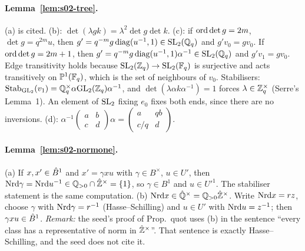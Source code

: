 \paragraph{Lemma~\ref{lem:s02-tree}.} (a) is cited. (b): $\det(\lambda g k)=\lambda^2\det g\det k$. (c): if
$\mathrm{ord}\det g=2m$, $\det g=q^{2m}u$, then $g'=q^{-m}g\,\mathrm{diag}(u^{-1},1)\in\mathrm{SL}_2(\mathbb{Q}_q)$ and $g'v_0=gv_0$. If
$\mathrm{ord}\det g=2m+1$, then $g'=q^{-m}g\,\mathrm{diag}(u^{-1},1)\alpha^{-1}\in\mathrm{SL}_2(\mathbb{Q}_q)$ and $g'v_1=gv_0$. Edge
transitivity holds because $\mathrm{SL}_2(\mathbb{Z}_q)\to\mathrm{SL}_2(\mathbb{F}_q)$ is surjective and acts transitively on
$\mathbb P^1(\mathbb{F}_q)$, which is the set of neighbours of $v_0$. Stabilisers: $\operatorname{Stab}_{\mathrm{GL}_2}(v_1)=\mathbb{Q}_q^\times\alpha\mathrm{GL}_2(\mathbb{Z}_q)\alpha^{-1}$,
and $\det(\lambda\alpha k\alpha^{-1})=1$ forces $\lambda\in\mathbb{Z}_q^\times$ (Serre's Lemma~1). An element of
$\mathrm{SL}_2$ fixing $e_0$ fixes both ends, since there are no inversions. (d):
$\alpha^{-1}\left(\begin{smallmatrix}a&b\\c&d\end{smallmatrix}\right)\alpha=\left(\begin{smallmatrix}a&qb\\c/q&d\end{smallmatrix}\right)$.

\paragraph{Lemma~\ref{lem:s02-normone}.} (a) If $x,x'\in\hat{B}^1$ and $x'=\gamma xu$ with $\gamma\in B^\times$,
$u\in U'$, then $\mathrm{Nrd}\gamma=\mathrm{Nrd} u^{-1}\in\mathbb{Q}_{>0}\cap\hat{\mathbb{Z}}^\times=\{1\}$, so $\gamma\in B^1$ and $u\in U'^1$. The
stabiliser statement is the same computation. (b) $\mathrm{Nrd} x\in\hat{\mathbb{Q}}^\times=\mathbb{Q}_{>0}\hat{\mathbb{Z}}^\times$. Write
$\mathrm{Nrd} x=rz$, choose $\gamma$ with $\mathrm{Nrd}\gamma=r^{-1}$ (Hasse--Schilling) and $u\in U'$ with $\mathrm{Nrd} u=z^{-1}$;
then $\gamma xu\in\hat{B}^1$. \emph{Remark:} the seed's proof of Prop.~quot uses (b) in the sentence ``every class
has a representative of norm in $\hat{\mathbb{Z}}^\times$''. That sentence is exactly Hasse--Schilling, and the seed does
not cite it.

